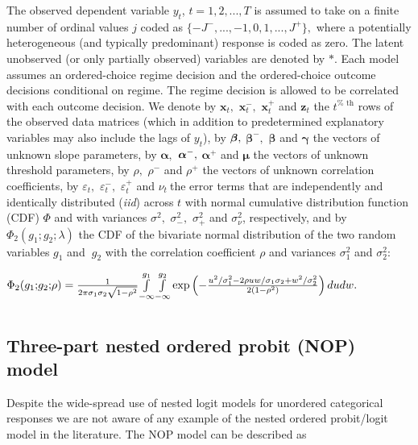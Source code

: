 \documentclass[letterpaper,fleqn,12pt]{article}
\begin{document}
\begin{onehalfspace}
The observed dependent variable $y_{t}$, $t=1,2,...,T$ is assumed to take on
a finite number of ordinal values $j$ coded as $%
\{-J^{-},...,-1,0,1,...,J^{+}\},$ where a potentially heterogeneous (and
typically predominant) response is coded as zero. The latent unobserved (or
only partially observed) variables are denoted by $\ast $. Each model
assumes an ordered-choice regime decision and the ordered-choice outcome
decisions conditional on regime. The regime decision is allowed to be
correlated with each outcome decision. We denote by $\mathbf{x}_{t},$ $%
\mathbf{x}_{t}^{-},$ $\mathbf{x}_{t}^{+}$ and $\mathbf{z}_{t}$ the $t^{\text{%
th}}$ rows of the observed data matrices (which in addition to predetermined
explanatory variables may also include the lags of $y_{t}$), by $\mathbf{%
\beta ,}$ $\mathbf{\beta }^{-},$ $\mathbf{\beta }$ and $\mathbf{\gamma }$
the vectors of unknown slope parameters, by $\mathbf{\alpha ,}$ $\mathbf{%
\alpha }^{-}\mathbf{,}$ $\mathbf{\alpha }^{+}$ and $\mathbf{\mu }$ the
vectors of unknown threshold parameters, by $\rho ,$ $\rho ^{-}$ and $\rho
^{+}$ the vectors of unknown correlation coefficients, by $\varepsilon _{t},$
$\varepsilon _{t}^{-},$ $\varepsilon _{t}^{+}$ and $\nu _{t}\ $the error
terms that are independently and identically distributed (\textit{iid})
across $t$ with normal cumulative distribution function (CDF) $\Phi $ and
with variances $\sigma ^{2},$ $\sigma _{-}^{2},$ $\sigma _{+}^{2}$ and $%
\sigma _{\nu }^{2}$, respectively, and by $\Phi _{2}(g_{1}\mathbf{;}g_{2}%
\mathbf{;}\lambda )$ the CDF of the bivariate normal distribution of the two
random variables $g_{1}$ and\textbf{\ }$g_{2}$ with the correlation
coefficient $\rho $ and variances $\sigma _{1}^{2}$ and $\sigma _{2}^{2}$:

\begin{center}
$\Phi _{2}(g_{1}\mathbf{;}g_{2}\mathbf{;}\rho )=\frac{1}{2\pi \sigma
_{1}\sigma _{2}\sqrt{1-\rho ^{2}}}\underset{}{\underset{-\infty }{\overset{%
g_{1}}{\int }}}\underset{-\infty }{\overset{g_{2}}{\int }}\exp \left( -\frac{%
u^{2}/\sigma _{1}^{2}-2\rho uw/\sigma _{1}\sigma _{2}+w^{2}/\sigma _{2}^{2}}{%
2(1-\rho ^{2})}\right) dudw.$
\end{center}

\subsection{Three-part nested ordered probit (NOP) model}

Despite the wide-spread use of nested logit models for unordered categorical
responses we are not aware of any example of the nested ordered probit/logit
model in the literature. The NOP model can be described as


\end{onehalfspace}
\end{document}
